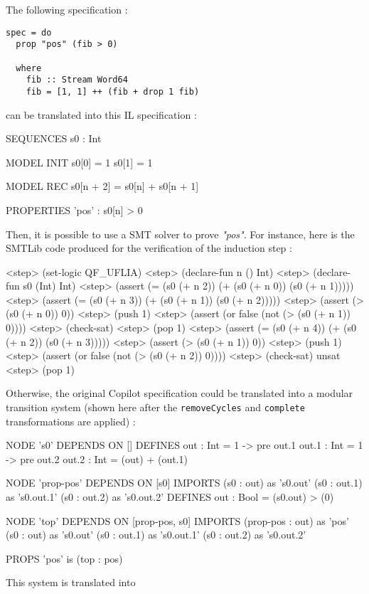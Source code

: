 The following specification :

\begin{lstlisting}[frame=single]
spec = do
  prop "pos" (fib > 0)

  where
    fib :: Stream Word64
    fib = [1, 1] ++ (fib + drop 1 fib)
\end{lstlisting}
can be translated into this IL specification :
\begin{code}
SEQUENCES
    s0 : Int

MODEL INIT
    s0[0] = 1
    s0[1] = 1

MODEL REC
    s0[n + 2] = s0[n] + s0[n + 1]

PROPERTIES
    'pos' : s0[n] > 0
\end{code}
Then, it is possible to use a SMT solver to prove \textit{"pos"}. For instance, here is the SMTLib code produced for the verification of the induction step :
\begin{code}
<step>  (set-logic QF_UFLIA)
<step>  (declare-fun n () Int)
<step>  (declare-fun s0 (Int) Int)
<step>  (assert (= (s0 (+ n 2)) (+ (s0 (+ n 0)) (s0 (+ n 1)))))
<step>  (assert (= (s0 (+ n 3)) (+ (s0 (+ n 1)) (s0 (+ n 2)))))
<step>  (assert (> (s0 (+ n 0)) 0))
<step>  (push 1)
<step>  (assert (or false (not (> (s0 (+ n 1)) 0))))
<step>  (check-sat)
<step>  (pop 1)
<step>  (assert (= (s0 (+ n 4)) (+ (s0 (+ n 2)) (s0 (+ n 3)))))
<step>  (assert (> (s0 (+ n 1)) 0))
<step>  (push 1)
<step>  (assert (or false (not (> (s0 (+ n 2)) 0))))
<step>  (check-sat)
unsat
<step>  (pop 1)
\end{code}

\bigskip

Otherwise, the original Copilot specification could be translated into a modular transition system (shown here after the \texttt{removeCycles} and \texttt{complete} transformations are applied) :
\begin{code}
NODE 's0' DEPENDS ON []
DEFINES
    out : Int =
        1 -> pre out.1
    out.1 : Int =
        1 -> pre out.2
    out.2 : Int =
        (out) + (out.1)

NODE 'prop-pos' DEPENDS ON [s0]
IMPORTS
    (s0 : out) as 's0.out'
    (s0 : out.1) as 's0.out.1'
    (s0 : out.2) as 's0.out.2'
DEFINES
    out : Bool =
        (s0.out) > (0)

NODE 'top' DEPENDS ON [prop-pos, s0]
IMPORTS
    (prop-pos : out) as 'pos'
    (s0 : out) as 's0.out'
    (s0 : out.1) as 's0.out.1'
    (s0 : out.2) as 's0.out.2'

PROPS
'pos' is (top : pos)
\end{code}
This system is translated into 

